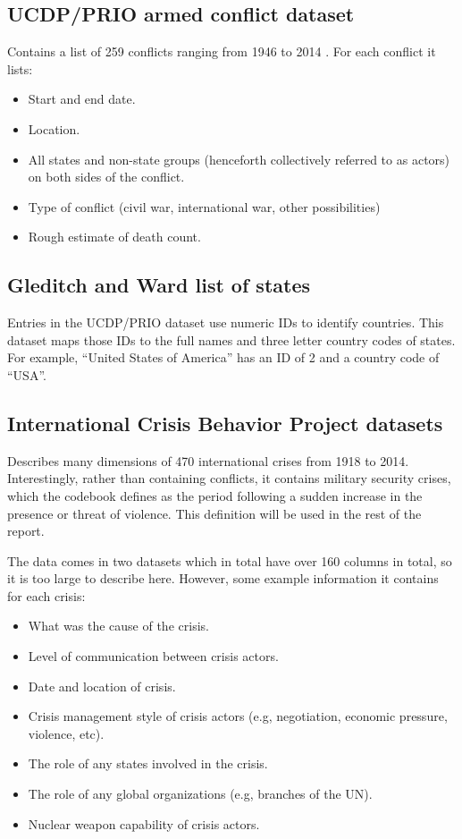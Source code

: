 \documentclass[12pt,parskip=half-]{scrartcl}
\begin{document}
\subsection{UCDP/PRIO armed conflict dataset}

Contains a list of 259 conflicts ranging from 1946 to 2014
\cite{ucdpconflictsdataset, ucdpconflictscodebook, ucdpconflicts}. For each
conflict it lists:

\begin{itemize}
    \item Start and end date.
    \item Location.
    \item All states and non-state groups (henceforth collectively referred to
        as actors) on both sides of the conflict.
    \item Type of conflict (civil war, international war, other possibilities)
    \item Rough estimate of death count.
\end{itemize}

\subsection{Gleditch and Ward list of states}

Entries in the UCDP/PRIO dataset use numeric IDs to identify countries. This
dataset maps those IDs to the full names and three letter country codes of
states. For example, ``United States of America'' has an ID of 2 and a country
code of ``USA''. \cite{gwstatesdataset}

\subsection{International Crisis Behavior Project datasets}

Describes many dimensions of 470 international crises from 1918 to 2014.
Interestingly, rather than containing conflicts, it contains military security
crises, which the codebook defines as the period following a sudden increase in
the presence or threat of violence. This definition will be used in the rest of
the report. \cite{icbdataset, icbcodebook, icb}

The data comes in two datasets which in total have over 160 columns in total,
so it is too large to describe here. However, some example information it
contains for each crisis:

\begin{itemize}
    \item What was the cause of the crisis.
    \item Level of communication between crisis actors.
    \item Date and location of crisis.
    \item Crisis management style of crisis actors (e.g, negotiation,
        economic pressure, violence, etc).
    \item The role of any states involved in the crisis.
    \item The role of any global organizations (e.g, branches of the UN).
    \item Nuclear weapon capability of crisis actors.
\end{itemize}
\end{document}
